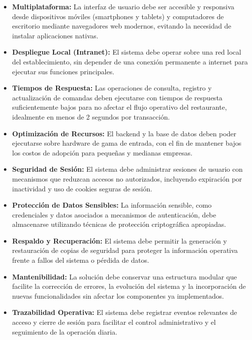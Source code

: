 \begin{itemize}
	\item \textbf{Multiplataforma:} La interfaz de usuario debe ser accesible y responsiva desde dispositivos móviles (smartphones y tablets) y computadores de escritorio mediante navegadores web modernos, evitando la necesidad de instalar aplicaciones nativas.
	
	\item \textbf{Despliegue Local (Intranet):} El sistema debe operar sobre una red local del establecimiento, sin depender de una conexión permanente a internet para ejecutar sus funciones principales.
	
	\item \textbf{Tiempos de Respuesta:} Las operaciones de consulta, registro y actualización de comandas deben ejecutarse con tiempos de respuesta suficientemente bajos para no afectar el flujo operativo del restaurante, idealmente en menos de 2 segundos por transacción.
	
	\item \textbf{Optimización de Recursos:} El backend y la base de datos deben poder ejecutarse sobre hardware de gama de entrada, con el fin de mantener bajos los costos de adopción para pequeñas y medianas empresas.
	
	\item \textbf{Seguridad de Sesión:} El sistema debe administrar sesiones de usuario con mecanismos que reduzcan accesos no autorizados, incluyendo expiración por inactividad y uso de cookies seguras de sesión.
	
	\item \textbf{Protección de Datos Sensibles:} La información sensible, como credenciales y datos asociados a mecanismos de autenticación, debe almacenarse utilizando técnicas de protección criptográfica apropiadas.
	
	\item \textbf{Respaldo y Recuperación:} El sistema debe permitir la generación y restauración de copias de seguridad para proteger la información operativa frente a fallos del sistema o pérdida de datos.
	
	\item \textbf{Mantenibilidad:} La solución debe conservar una estructura modular que facilite la corrección de errores, la evolución del sistema y la incorporación de nuevas funcionalidades sin afectar los componentes ya implementados.
	
	\item \textbf{Trazabilidad Operativa:} El sistema debe registrar eventos relevantes de acceso y cierre de sesión para facilitar el control administrativo y el seguimiento de la operación diaria.
\end{itemize}




